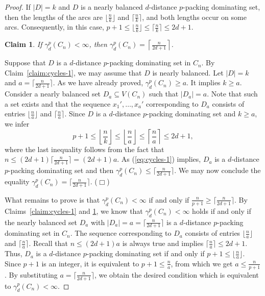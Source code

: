 \documentclass[12pt]{article}
\newtheorem{claim}{Claim}
\newcommand{\smallqed}{{\tiny ($\Box$)}}
\begin{document}
\begin{proof}
If $|D|= k$ and $D$ is a nearly balanced $d$-distance $p$-packing dominating set, then the lengths of the arcs are $\lfloor\frac{n}{k} \rfloor$ and $\lceil\frac{n}{k} \rceil$, and both lengths occur on some arcs. Consequently, in this case, $p+1 \le \lfloor\frac{n}{k} \rfloor \le \lceil\frac{n}{k} \rceil \le 2d+1 $.
\begin{claim} \label{claim:cycles-2}
If $\gamma_d^p(C_n) <\infty$, then $\gamma_d^p(C_n) =  \left\lceil\frac{n}{2d+1}\right\rceil$.    
\end{claim}
\proof Suppose that $D$ is a $d$-distance $p$-packing dominating set in $C_n$. By Claim~\ref{claim:cycles-1}, we may assume that $D$ is nearly balanced. Let $|D|=k$ and $a= \lceil\frac{n}{2d+1}\rceil$. As we have already proved, $\gamma_d^p(C_n) \ge a$. It implies $k \ge a$. Consider a nearly balanced set $D_a \subseteq V(C_n)$ such that $|D_a|=a$. Note that such a set exists and that the sequence $x_1', \dots , x_a'$ corresponding to $D_a$ consists of entries $\lfloor\frac{n}{a} \rfloor$ and $\lceil\frac{n}{a} \rceil$. Since $D$ is a $d$-distance $p$-packing dominating set and $k \ge a$, we infer
\begin{equation} \label{eq:cycles-1}
   \displaystyle p+1 \le \left\lfloor\frac{n}{k} \right\rfloor \le \left\lfloor\frac{n}{a} \right\rfloor \le \left\lceil\frac{n}{a} \right\rceil \le 2d+1, 
\end{equation}
where the last inequality follows from the fact that $n \leq (2d+1) \lceil\frac{n}{2d+1} \rceil = (2d+1)a $. As (\ref{eq:cycles-1}) implies, $D_a$ is a $d$-distance $p$-packing dominating set and then $\gamma_d^p(C_n) \le \lceil\frac{n}{2d+1} \rceil $. We may now conclude the equality $\gamma_d^p(C_n) = \lceil\frac{n}{2d+1} \rceil $. \smallqed
\medskip

What remains to prove is that $\gamma_d^p(C_n) <\infty$ if and only if $\frac{n}{p+1} \ge \lceil\frac{n}{2d+1} \rceil$. By Claims~\ref{claim:cycles-1} and \ref{claim:cycles-2}, we know that $\gamma_d^p(C_n) <\infty$ holds if and only if the nearly balanced set $D_a$ with $|D_a|=a = \lceil\frac{n}{2d+1} \rceil$ is a $d$-distance $p$-packing dominating set in $C_n$. The sequence corresponding to $D_a$ consists of entries $\lfloor\frac{n}{a} \rfloor$ and $\lceil\frac{n}{a} \rceil$. Recall that $n \leq (2d+1)a $ is always true and implies $\lceil\frac{n}{a}\rceil \leq 2d+1$. Thus, $D_a$ is a $d$-distance $p$-packing dominating set if and only if $p+1 \le \lfloor \frac{n}{a}\rfloor$. Since $p+1$ is an integer, it is equivalent to $p+1 \le \frac{n}{a}$, from which we get $a \le \frac{n}{p+1}$. By substituting $a=\lceil \frac{n}{2d+1}\rceil$, we obtain the desired condition which is equivalent to $\gamma_d^p(C_n) < \infty$.    
\end{proof}
\end{document}
